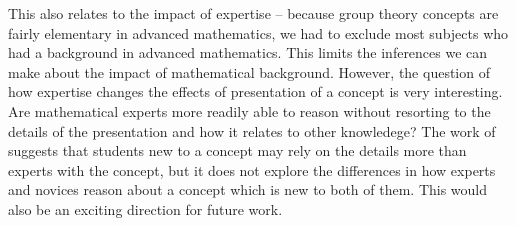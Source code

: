 \documentclass[man,10pt]{apa6}
\begin{document}
This also relates to the impact of expertise -- because group theory concepts are fairly elementary in advanced mathematics, we had to exclude most subjects who had a background in advanced mathematics. This limits the inferences we can make about the impact of mathematical background. However, the question of how expertise changes the effects of presentation of a concept is very interesting. Are mathematical experts more readily able to reason without resorting to the details of the presentation and how it relates to other knowledege? The work of  suggests that students new to a concept may rely on the details more than experts with the concept, but it does not explore the differences in how experts and novices reason about a concept which is new to both of them. This would also be an exciting direction for future work.\par
\end{document}
